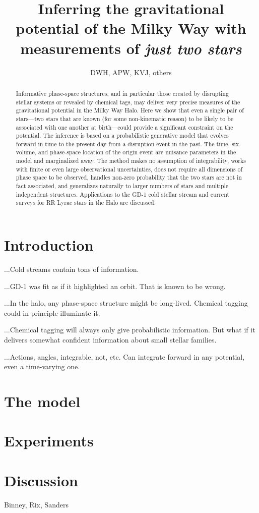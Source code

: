 \documentclass[letterpaper,12pt,preprint]{aastex}
\begin{document}
\title{Inferring the gravitational potential of the Milky Way with measurements of \emph{just two stars}}
\author{DWH, APW, KVJ, others}

\begin{abstract}
Informative phase-space structures, and in particular those created by
disrupting stellar systems or revealed by chemical tags, may deliver
very precise measures of the gravitational potential in the Milky Way
Halo.  Here we show that even a single pair of stars---two stars that
are known (for some non-kinematic reason) to be likely to be
associated with one another at birth---could provide a significant
constraint on the potential.  The inference is based on a
probabilistic generative model that evolves forward in time to the
present day from a disruption event in the past.  The time,
six-volume, and phase-space location of the origin event are nuisance
parameters in the model and marginalized away.  The method makes no
assumption of integrability, works with finite or even large
observational uncertainties, does not require all dimensions of phase
space to be observed, handles non-zero probability that the two stars
are not in fact associated, and generalizes naturally to larger
numbers of stars and multiple independent structures.  Applications to
the GD-1 cold stellar stream and current surveys for RR Lyrae stars in
the Halo are discussed.
\end{abstract}


\section{Introduction}

...Cold streams contain tons of information.

...GD-1 was fit as if it highlighted an orbit.  That is known to be
wrong.

...In the halo, any phase-space structure might be long-lived.
Chemical tagging could in principle illuminate it.

...Chemical tagging will always only give probabilistic information.
But what if it delivers somewhat confident information about small
stellar families.

...Actions, angles, integrable, not, etc.  Can integrate forward in
any potential, even a time-varying one.

\section{The model}

\section{Experiments}

\section{Discussion}

\acknowledgements
Binney, Rix, Sanders
\end{document}
